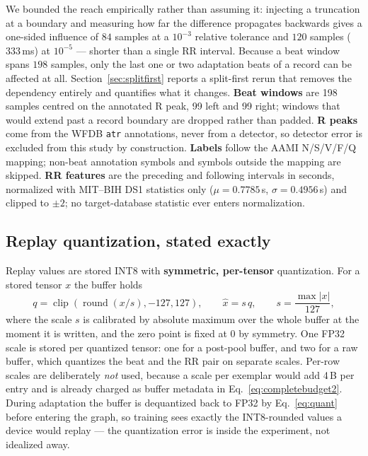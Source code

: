 We bounded the reach empirically rather than assuming it: injecting a truncation
at a boundary and measuring how far the difference propagates backwards gives a
one-sided influence of $84$ samples at a $10^{-3}$ relative tolerance and
$120$ samples ($333$\,ms) at $10^{-5}$ --- shorter than a single RR interval.
Because a beat window spans $198$ samples, only the last one or two adaptation
beats of a record can be affected at all. Section~\ref{sec:splitfirst} reports a
split-first rerun that removes the dependency entirely and quantifies what it
changes.
\textbf{Beat windows} are 198 samples centred on the annotated R peak, 99 left
and 99 right; windows that would extend past a record boundary are dropped rather
than padded. \textbf{R peaks} come from the WFDB \texttt{atr} annotations, never
from a detector, so detector error is excluded from this study by construction.
\textbf{Labels} follow the AAMI N/S/V/F/Q mapping; non-beat annotation symbols
and symbols outside the mapping are skipped.
\textbf{RR features} are the preceding and following intervals in seconds,
normalized with MIT--BIH DS1 statistics only ($\mu = 0.7785$\,s,
$\sigma = 0.4956$\,s) and clipped to $\pm 2$; no target-database statistic ever
enters normalization.

\subsection{Replay quantization, stated exactly}
\label{sec:quant}

Replay values are stored INT8 with \textbf{symmetric, per-tensor} quantization.
For a stored tensor $x$ the buffer holds
\begin{equation}
q=\operatorname{clip}\!\left(\operatorname{round}\!\left(x/s\right),-127,127\right),
\qquad
\hat{x}=s\,q,
\qquad
s=\frac{\max|x|}{127},
\label{eq:quant}
\end{equation}
where the scale $s$ is calibrated by absolute maximum over the whole buffer at
the moment it is written, and the zero point is fixed at $0$ by symmetry. One
FP32 scale is stored per quantized tensor: one for a post-pool buffer, and two
for a raw buffer, which quantizes the beat and the RR pair on separate scales.
Per-row scales are deliberately \emph{not} used, because a scale per exemplar
would add 4\,B per entry and is already charged as buffer metadata in
Eq.~\eqref{eq:completebudget2}. During adaptation the buffer is dequantized back
to FP32 by Eq.~\eqref{eq:quant} before entering the graph, so training sees
exactly the INT8-rounded values a device would replay --- the quantization error
is inside the experiment, not idealized away.

